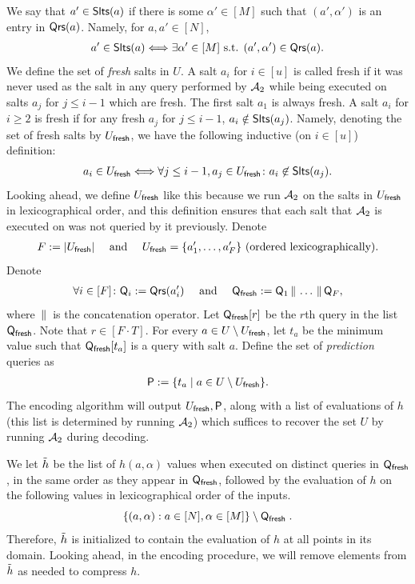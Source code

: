 We say that $a'\in \mathsf{Slts}(a)$ if there is some $\alpha'\in [M]$ such that $(a',\alpha')$ is an entry in $\mathsf{Qrs}(a)$. Namely, for $a,a'\in [N]$, 
\begin{align*}
a'\in \mathsf{Slts}(a) \Longleftrightarrow \exists \alpha' \in [M] \text{ s.t. } (a',\alpha') \in \mathsf{Qrs}(a).
\end{align*}
 We define the set of \emph{fresh} salts in $U$. A salt $a_i$ for $i \in [u]$ is called fresh if it was never used as the salt in any query performed by $\mathcal{A}_2$ while being executed on salts $a_j$ for $j\le i-1$ which are fresh. The first salt $a_1$ is always fresh. A salt $a_i$ for $i \ge 2$ is fresh if for any fresh $a_j$ for $j \le i-1$, $a_i \notin \mathsf{Slts}(a_j)$. Namely, denoting the set of fresh salts by $U_\textsf{fresh}$, we have the following inductive (on $i\in [u]$) definition:
 \begin{align*}
a_i\in U_\textsf{fresh} \Longleftrightarrow \forall j\le i-1,  a_j \in U_\textsf{fresh}\colon a_i \not \in \mathsf{Slts}(a_j).  
\end{align*}
Looking ahead, we define $U_\textsf{fresh}$ like this because we run $\mathcal{A}_2$ on the salts in $U_\textsf{fresh}$ in lexicographical order, and this definition ensures that each salt that $\mathcal{A}_2$ is executed on was not queried by it previously. Denote 
\begin{align*}
F := |U_\textsf{fresh}| \quad \text{ and }  \quad U_\textsf{fresh}=\{a_1',\ldots,a_F'\} \text{ (ordered lexicographically).}
\end{align*}
Denote
\begin{align*}
 \forall i\in [F]\colon \mathsf{Q}_i:=\mathsf{Qrs}(a_i') \quad \text{ and } \quad \mathsf{Q}_\textsf{fresh}:=\mathsf{Q}_1\,\|\,\ldots\,\|\, \mathsf{Q}_F,
 \end{align*}
 where $\,\|\,$ is the concatenation operator. Let $\mathsf{Q}_\textsf{fresh}[r]$ be the $r$th query in the list $\mathsf{Q}_\textsf{fresh}$. Note that $r\in [F\cdot T]$.
 For every $a\in U\setminus U_\textsf{fresh}$, let $t_a$ be the minimum value such that $\mathsf{Q}_\textsf{fresh}[t_a]$ is a query with salt $a$. 
 Define the set of \emph{prediction} queries as 
 \begin{align*}
 \mathsf{P}:=\{t_a\mid a\in U\setminus U_\textsf{fresh}\}.
 \end{align*}
The encoding algorithm will output $U_\textsf{fresh},\mathsf{P}$, along with a list of evaluations of $h$ (this list is determined by running $\mathcal{A}_2$) which suffices to recover the set $U$ by running $\mathcal{A}_2$ during decoding.

 We let $\tilde{h}$ be the list of $h(a,\alpha)$ values when executed on distinct queries in $\mathsf{Q}_\textsf{fresh}$, in the same order as they appear in $\mathsf{Q}_\textsf{fresh}$, followed by the evaluation of $h$ on the following values in lexicographical order of the inputs. 
 \[
 \{(a,\alpha):a\in [N],\alpha\in [M]\}\setminus \mathsf{Q}_\textsf{fresh}\;.
 \]
 Therefore, $\tilde{h}$ is initialized to contain the evaluation of $h$ at all points in its domain. Looking ahead, in the encoding procedure, we will remove elements from $\tilde{h}$ as needed to compress $h$.


